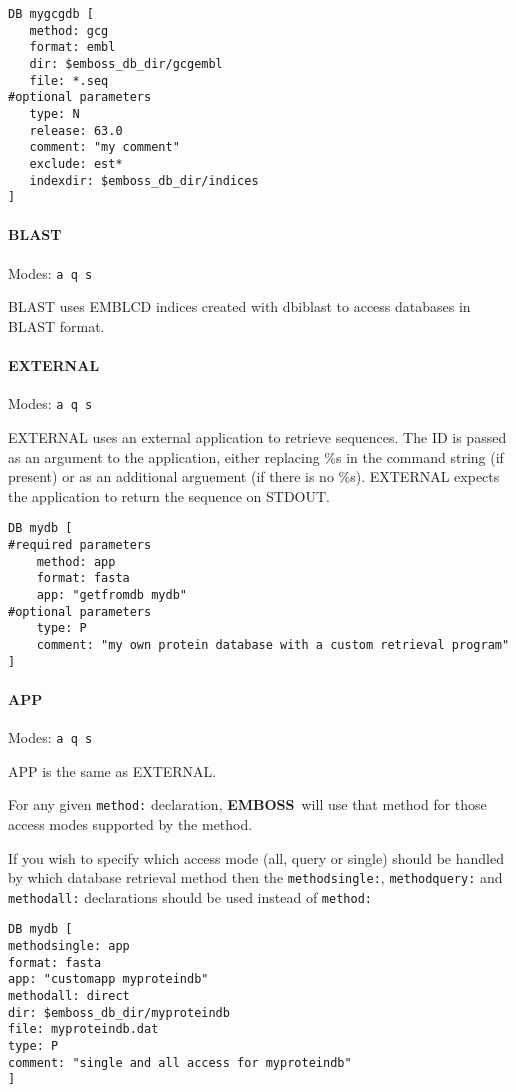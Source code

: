 \documentclass{report}
\newcommand{\ilcomm}[1]{{\tt #1}}
\newcommand{\progname}[1]{{\sc #1}}
\newcommand{\EMBOSS}{{\sf\bfseries EMBOSS}}
\begin{document}
\begin{verbatim}
DB mygcgdb [
   method: gcg
   format: embl
   dir: $emboss_db_dir/gcgembl
   file: *.seq
#optional parameters
   type: N
   release: 63.0
   comment: "my comment"
   exclude: est*
   indexdir: $emboss_db_dir/indices
]
\end{verbatim}

 
\paragraph{BLAST}\par\noindent
Modes: \ilcomm{a q s} \par\noindent
BLAST uses EMBLCD indices created with \progname{dbiblast} to access databases in BLAST format. 


\paragraph{EXTERNAL}\par\noindent
Modes: \ilcomm{a q s}\par\noindent
EXTERNAL uses an external application to retrieve sequences. 
The ID is passed as an argument to the application, either replacing \%s in the command string (if present) or as an additional arguement (if there is no \%s).
EXTERNAL expects the application to return the sequence on STDOUT. 

\begin{verbatim}
DB mydb [
#required parameters
    method: app
    format: fasta
    app: "getfromdb mydb"
#optional parameters
    type: P
    comment: "my own protein database with a custom retrieval program"
]
\end{verbatim}

\paragraph{APP}\par\noindent
Modes: \ilcomm{a q s}\par\noindent
APP is the same as EXTERNAL.

For any given \ilcomm{method:} declaration, \EMBOSS\ will use that method for those access modes supported by the method.

If you wish to specify which access mode (all, query or single) should be handled by which database retrieval method then the \ilcomm{methodsingle:}, \ilcomm{methodquery:} and \ilcomm{methodall:} declarations should be used instead of \ilcomm{method:}
\begin{verbatim}
DB mydb [
methodsingle: app
format: fasta
app: "customapp myproteindb"
methodall: direct
dir: $emboss_db_dir/myproteindb
file: myproteindb.dat
type: P
comment: "single and all access for myproteindb"
]
\end{verbatim}
\end{document}

